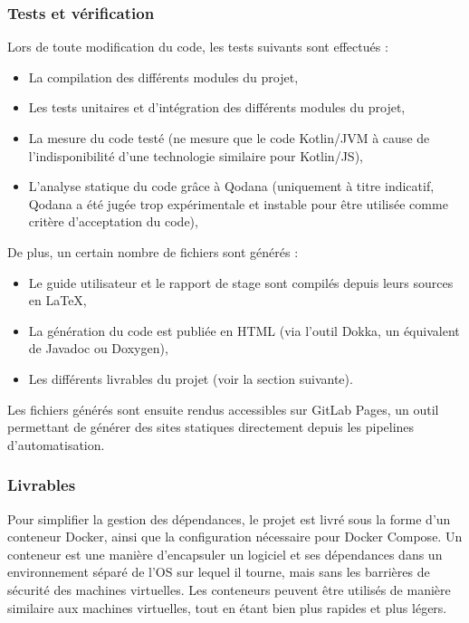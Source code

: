 \subsubsection{Tests et vérification}

Lors de toute modification du code, les tests suivants sont effectués :
\begin{itemize}
	\item La compilation des différents modules du projet,
	\item Les tests unitaires et d'intégration des différents modules du projet,
	\item La mesure du code testé (ne mesure que le code Kotlin/JVM à cause de l'indisponibilité d'une technologie similaire pour Kotlin/JS),
	\item L'analyse statique du code grâce à Qodana (uniquement à titre indicatif, Qodana a été jugée trop expérimentale et instable pour être utilisée comme critère d'acceptation du code),
\end{itemize}

De plus, un certain nombre de fichiers sont générés :
\begin{itemize}
	\item Le guide utilisateur et le rapport de stage sont compilés depuis leurs sources en LaTeX,
	\item La génération du code est publiée en HTML (via l'outil Dokka, un équivalent de Javadoc ou Doxygen),
	\item Les différents livrables du projet (voir la section suivante).
\end{itemize}
Les fichiers générés sont ensuite rendus accessibles sur GitLab Pages, un outil permettant de générer des sites statiques directement depuis les pipelines d'automatisation.

\subsubsection{Livrables}

Pour simplifier la gestion des dépendances, le projet est livré sous la forme d'un conteneur Docker, ainsi que la configuration nécessaire pour Docker Compose.
Un conteneur est une manière d'encapsuler un logiciel et ses dépendances dans un environnement séparé de l'OS sur lequel il tourne, mais sans les barrières de sécurité des machines virtuelles.
Les conteneurs peuvent être utilisés de manière similaire aux machines virtuelles, tout en étant bien plus rapides et plus légers.

